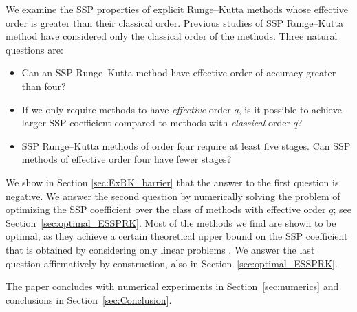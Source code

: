 We examine the SSP properties of explicit Runge--Kutta methods whose
effective order is greater than their classical order.
Previous studies of SSP Runge--Kutta method have considered only the
classical order of the methods.
Three natural questions are:
\begin{itemize}
    \item Can an SSP Runge--Kutta method have effective order of accuracy greater than four?
    \item If we only require methods to have {\em effective} order $q$, is it possible to achieve larger
            SSP coefficient compared to methods with {\em classical} order $q$?
    \item SSP Runge--Kutta methods of order four require at least five stages.  Can SSP methods of 
          effective order four have fewer stages?
          
\end{itemize}
We show in Section \ref{sec:ExRK_barrier} that the answer to the first question is negative.
We answer the second question by numerically solving the problem of optimizing
the SSP coefficient over the class of methods with effective order $q$;
see Section~\ref{sec:optimal_ESSPRK}.  
Most of the methods we find are shown to be optimal, as they achieve a certain theoretical
upper bound on the SSP coefficient that is obtained by considering only
linear problems \cite{Kraaijevanger1986}.
We answer the last question affirmatively
by construction, also in Section~\ref{sec:optimal_ESSPRK}.

The paper concludes with numerical experiments in
Section~\ref{sec:numerics} and conclusions in
Section~\ref{sec:Conclusion}.
